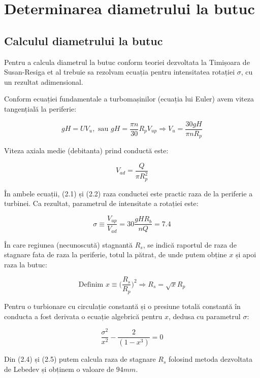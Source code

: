 \chapter{Determinarea diametrului la butuc}\label{chapter:butuc}

\section{Calculul diametrului la butuc}

Pentru a calcula diametrul la butuc conform teoriei dezvoltata la Timișoara de Susan-Resiga et al \cite{susanhub} trebuie sa rezolvam ecuația pentru intensitatea rotației $\sigma$, cu un rezultat adimensional.

Conform ecuației fundamentale a turbomașinilor (ecuația lui Euler) avem viteza tangențială la periferie:

\begin{equation}
gH=UV_{u}, \text{ sau } gH=\frac{\pi n}{30} R_{p} V_{up} \Rightarrow V_{u}=\frac{30gH}{\pi n R_{p}}
\end{equation}

Viteza axiala medie (debitanta) prind conductă este:

\begin{equation}
V_{ad}=\frac{Q}{\pi R_{p}^2}
\end{equation}

În ambele ecuații, (2.1) și (2.2) raza conductei este practic raza de la periferie a turbinei. Ca rezultat, parametrul de intensitate a rotației este:

\begin{equation}
\sigma \equiv \frac{V_{up}}{V_{ad}} = 30 \frac{g H R_{b}}{n Q} = 7.4
\end{equation}

În care regiunea (necunoscută) stagnantă $R_{s}$, se indică raportul de raza de stagnare fata de raza la periferie, totul la pătrat, de unde putem obține $x$ și apoi raza la butuc:

\begin{equation}
\text{Definim } x \equiv \bigg(\frac{R_{s}}{R_{p}}\bigg)^2 \Rightarrow R_{s} = \sqrt{x} R_{p}
\end{equation}

Pentru o turbionare cu circulație constantă și o presiune totală constantă în conducta a fost derivata \cite{susanhub} o ecuație algebrică pentru $x$, dedusa cu parametrul $\sigma$:

\begin{equation}
\frac{\sigma^2}{x^2} - \frac{2}{(1-x^3)} = 0
\end{equation}

Din (2.4) și (2.5) putem calcula raza de stagnare $R_{s}$ folosind metoda dezvoltata de Lebedev \cite{lebedev1991formulae} și obținem o valoare de $94\si{mm}$.

\clearpage